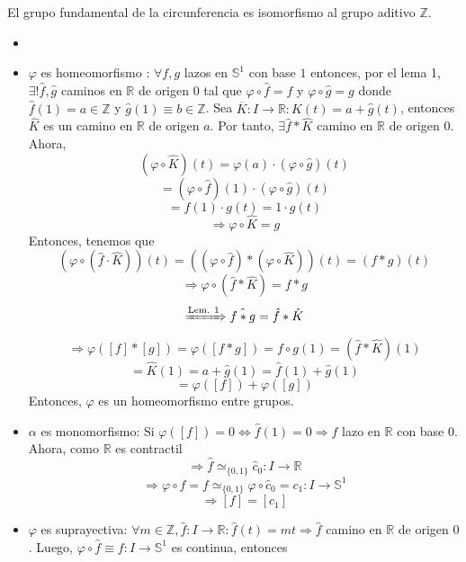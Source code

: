 \begin{theo}
  El grupo fundamental de la circunferencia es isomorfismo al grupo aditivo $\mathbb{Z}$.
\end{theo}

\begin{dem}
  \begin{itemize}
    \item []
    \item $\varphi$ es homeomorfismo : $\forall f,g$ lazos en $\mathbb{S}^{1}$ con base $1$ entonces, por el lema 1, $\exists ! \hat{ f }, \hat{ g }$ caminos en $\mathbb{R}$ de origen $0$ tal que $\varphi \circ \hat{ f } = f$ y $\varphi \circ \hat{ g } = g$ donde $\hat{ f }(1) = a \in \mathbb{Z}$ y $\hat{ g }(1) \equiv b \in \mathbb{Z}$. Sea $\overline{K} : I \to \mathbb{R} : \hat{ K }(t) = a + \hat{ g }(t) $, entonces $\hat{ K }$ es un camino en $\mathbb{R}$ de origen $a$. Por tanto, $\exists \hat{ f } * \hat{ K }$ camino en $\mathbb{R}$ de origen $ 0$. Ahora,
      \[ 
        (\varphi \circ \hat{ K })(t) = \varphi(a) \cdot (\varphi \circ \hat{ g })(t)
      \] 
      \[ 
        = (\varphi \circ \hat{ f })(1) \cdot (\varphi \circ \hat{ g })(t) 
      \] 
      \[ 
        = f(1) \cdot g(t) = 1 \cdot g(t)
      \] 
      \[ 
        \Rightarrow \varphi \circ \hat{ K } = g
      \] 
      Entonces, tenemos que
      \[ 
        (\varphi \circ (\hat{ f } \cdot \hat{ K }))(t) = ((\varphi \circ \hat{ f }) * (\varphi \circ \hat{ K }))(t) = (f * g)(t)
      \] 
      \[ 
        \Rightarrow \varphi \circ (\hat{ f } * \hat{ K }) = f * g
      \] 
      \[ 
        \xRightarrow[]{ \text{Lem. 1} } \hat{ f * g } = \hat{ f } * \hat{ K }
      \] 
      \[ 
        \Rightarrow \varphi([ f ] * [ g ])  = \varphi([ f * g ]) = \hat{ f \circ g }(1) = (\hat{ f } * \hat{ K })(1)
      \] 
      \[ 
        = \hat{ K }(1) = a + \hat{ g }(1) = \hat{ f }(1) + \hat{ g }(1)
      \] 
      \[ 
        = \varphi([ f ]) + \varphi([ g ])
      \] 
      Entonces, $ \varphi$ es un homeomorfismo entre grupos.
    \item $\alpha$ es monomorfismo: Si $\varphi([ f ]) = 0 \Leftrightarrow \hat{ f }(1) = 0 \Rightarrow \hat{ f }$ lazo en $\mathbb{R}$ con base $0$. Ahora, como $\mathbb{R}$ es contractil
      \[ 
        \Rightarrow \hat{ f } \simeq_{\{ 0, 1 \}} \hat{ c }_{0} : I \to \mathbb{R}
      \] 
      \[ 
        \Rightarrow \varphi \circ \hat{ f } = f \simeq_{\{ 0, 1 \}}  \varphi \circ \hat{ c }_{0} = c_{1} : I \to \mathbb{S}^{1}
      \] 
      \[ 
        \Rightarrow [ f ] = [ c_{1} ] 
      \] 
    \item $\varphi$ es suprayectiva: $\forall m \in \mathbb{Z}, \hat{ f } : I \to \mathbb{R} : \hat{ f }(t) = m t \Rightarrow \hat{ f }$ camino en $\mathbb{R}$ de origen $0$. Luego, $\varphi \circ \hat{ f } \equiv f :  I \to \mathbb{S}^{1}$ es continua, entonces

\end{itemize}
\end{dem}
